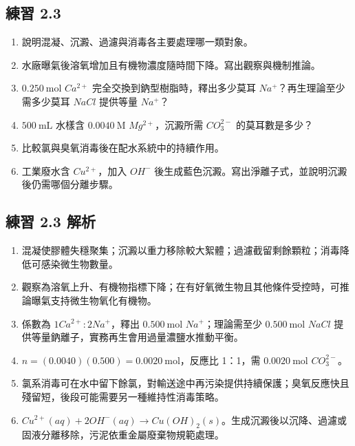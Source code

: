 \documentclass[11pt,a4paper]{article}
\providecommand{\tightlist}{%
  \setlength{\itemsep}{0pt}\setlength{\parskip}{0pt}}
\begin{document}
\subsection{練習 2.3}\label{ux7df4ux7fd2-2.3}

\begin{enumerate}
\def\labelenumi{\arabic{enumi}.}
\tightlist
\item
  說明混凝、沉澱、過濾與消毒各主要處理哪一類對象。
\item
  水廠曝氣後溶氧增加且有機物濃度隨時間下降。寫出觀察與機制推論。
\item
  \(0.250\ \mathrm{mol}\) \(Ca^{2+}\) 完全交換到鈉型樹脂時，釋出多少莫耳 \(Na^+\)？再生理論至少需多少莫耳 \(NaCl\) 提供等量 \(Na^+\)？
\item
  \(500\ \mathrm{mL}\) 水樣含 \(0.0040\ \mathrm M\) \(Mg^{2+}\)，沉澱所需 \(CO_3^{2-}\) 的莫耳數是多少？
\item
  比較氯與臭氧消毒後在配水系統中的持續作用。
\item
  工業廢水含 \(Cu^{2+}\)，加入 \(OH^-\) 後生成藍色沉澱。寫出淨離子式，並說明沉澱後仍需哪個分離步驟。
\end{enumerate}

\subsection{練習 2.3 解析}\label{ux7df4ux7fd2-2.3-ux89e3ux6790}

\begin{enumerate}
\def\labelenumi{\arabic{enumi}.}
\tightlist
\item
  混凝使膠體失穩聚集；沉澱以重力移除較大絮體；過濾截留剩餘顆粒；消毒降低可感染微生物數量。
\item
  觀察為溶氧上升、有機物指標下降；在有好氧微生物且其他條件受控時，可推論曝氣支持微生物氧化有機物。
\item
  係數為 \(1Ca^{2+}:2Na^+\)，釋出 \(0.500\ \mathrm{mol}\) \(Na^+\)；理論需至少 \(0.500\ \mathrm{mol}\) \(NaCl\) 提供等量鈉離子，實務再生會用過量濃鹽水推動平衡。
\item
  \(n=(0.0040)(0.500)=0.0020\ \mathrm{mol}\)，反應比 1：1，需 \(0.0020\ \mathrm{mol}\) \(CO_3^{2-}\)。
\item
  氯系消毒可在水中留下餘氯，對輸送途中再污染提供持續保護；臭氧反應快且殘留短，後段可能需要另一種維持性消毒策略。
\item
  \(Cu^{2+}(aq)+2OH^-(aq)\rightarrow Cu(OH)_2(s)\)。生成沉澱後以沉降、過濾或固液分離移除，污泥依重金屬廢棄物規範處理。
\end{enumerate}
\end{document}
